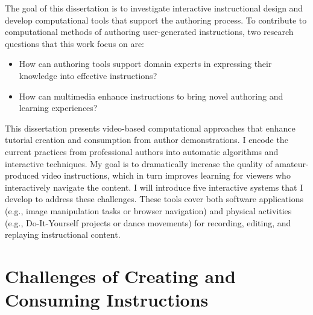 The goal of this dissertation is to investigate interactive instructional design and develop computational tools that support the authoring process.
%
To contribute to computational methods of authoring user-generated instructions, two research questions that this work focus on are:\\
\vspace{12pt}
\begin{itemize}
  \item How can authoring tools support domain experts in expressing their knowledge into effective instructions?
  \item How can multimedia enhance instructions to bring novel authoring and learning experiences?
\end{itemize}

This dissertation presents video-based computational approaches that enhance tutorial creation and consumption from author demonstrations.
I encode the current practices from professional authors into automatic algorithms and interactive techniques.
My goal is to dramatically increase the quality of amateur-produced video instructions, which in turn improves learning for viewers who interactively navigate the content.
%
I will introduce five interactive systems that I develop to address these challenges. These tools cover both software applications (e.g., image manipulation tasks or browser navigation) and physical activities (e.g., Do-It-Yourself projects or dance movements) for recording, editing, and replaying instructional content.


\section{Challenges of Creating and Consuming Instructions}

